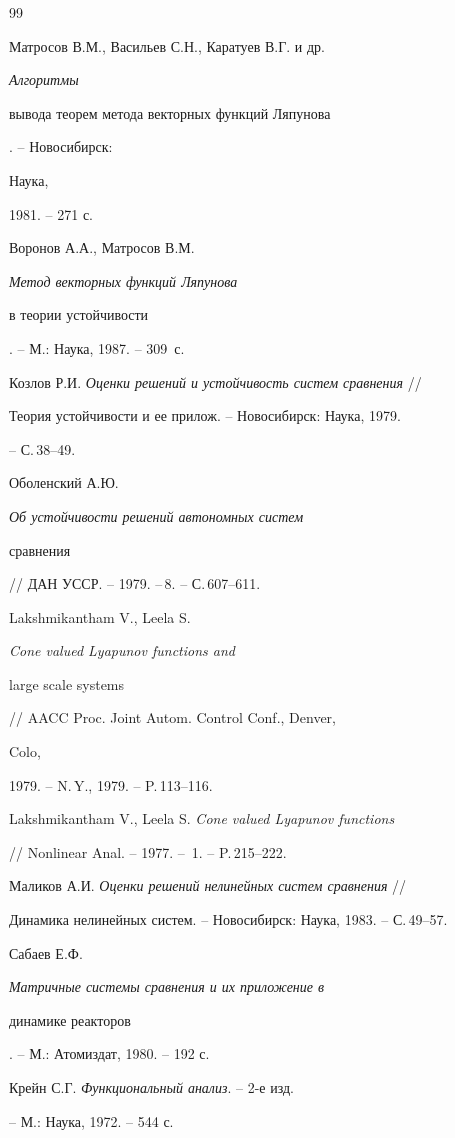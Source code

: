 {\begin{thebibliography}{99}


Матросов В.М., Васильев С.Н., Каратуев В.Г. и др. {\em Алгоритмы 


вывода теорем метода векторных функций Ляпунова}. -- Новосибирск: 


Наука, 


1981. -- 271 с. 




Воронов А.А., Матросов В.М. {\em Метод векторных функций Ляпунова


в теории устойчивости}. -- М.: Наука, 1987. -- 309~с. 




Козлов Р.И. {\em Оценки решений и устойчивость систем сравнения} // 


Теория устойчивости и ее прилож. -- Новосибирск: Наука, 1979. 


-- С.\,38--49. 




Оболенский А.Ю. {\em Об устойчивости решений автономных систем 


сравнения} // ДАН УССР. -- 1979. --\No\,8. -- С.\,607--611. 




Lakshmikantham V., Leela S. {\em Cone valued Lyapunov functions and 


large scale systems} // AACC Proc. Joint Autom. Control Conf., Denver, 


Colo, 


1979. -- N.\,Y., 1979. -- P.\,113--116. 




Lakshmikantham V., Leela S. {\em Cone valued Lyapunov functions} 


// Nonlinear Anal. -- 1977. -- \No\,1. -- P.\,215--222. 




Маликов А.И. {\em Оценки решений нелинейных систем сравнения} // 


Динамика нелинейных систем. -- Новосибирск: Наука, 1983. -- С.\,49--57. 




Сабаев Е.Ф. {\em Матричные системы сравнения и их приложение в 


динамике реакторов}. -- М.: Атомиздат, 1980. -- 192 с. 




Крейн С.Г. {\em Функциональный анализ}. -- 2-е изд.


-- М.: Наука, 1972. -- 544 с. 



\end{thebibliography}}
